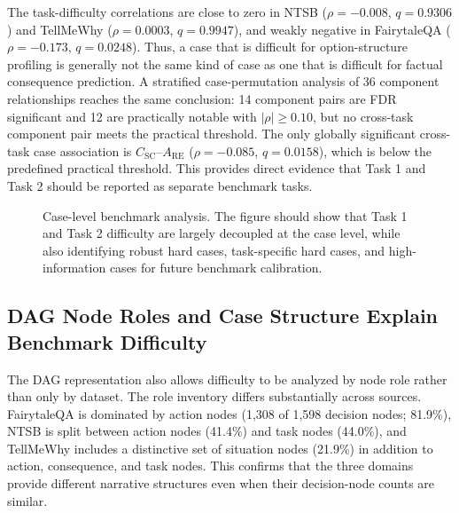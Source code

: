 \documentclass[pdflatex,sn-mathphys-num]{sn-jnl}%
\theoremstyle{thmstyleone}%
\theoremstyle{thmstyletwo}%
\theoremstyle{thmstylethree}%
\begin{document}
The task-difficulty correlations are close to zero in NTSB ($\rho=-0.008$, $q=0.9306$) and TellMeWhy ($\rho=0.0003$, $q=0.9947$), and weakly negative in FairytaleQA ($\rho=-0.173$, $q=0.0248$). Thus, a case that is difficult for option-structure profiling is generally not the same kind of case as one that is difficult for factual consequence prediction. A stratified case-permutation analysis of 36 component relationships reaches the same conclusion: 14 component pairs are FDR significant and 12 are practically notable with $|\rho|\ge 0.10$, but no cross-task component pair meets the practical threshold. The only globally significant cross-task case association is $C_{\mathrm{SC}}$--$A_{\mathrm{RE}}$ ($\rho=-0.085$, $q=0.0158$), which is below the predefined practical threshold. This provides direct evidence that Task 1 and Task 2 should be reported as separate benchmark tasks.

\begin{figure}[htbp]
\centering
{}
\caption{Case-level benchmark analysis. The figure should show that Task 1 and Task 2 difficulty are largely decoupled at the case level, while also identifying robust hard cases, task-specific hard cases, and high-information cases for future benchmark calibration.}
\label{fig:results-case-analysis}
\end{figure}

\subsection{DAG Node Roles and Case Structure Explain Benchmark Difficulty}
The DAG representation also allows difficulty to be analyzed by node role rather than only by dataset. The role inventory differs substantially across sources. FairytaleQA is dominated by action nodes (1,308 of 1,598 decision nodes; 81.9\%), NTSB is split between action nodes (41.4\%) and task nodes (44.0\%), and TellMeWhy includes a distinctive set of situation nodes (21.9\%) in addition to action, consequence, and task nodes. This confirms that the three domains provide different narrative structures even when their decision-node counts are similar.
\end{document}
